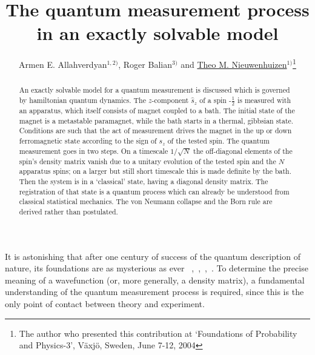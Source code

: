 \documentclass[aps,prb,floatfix,twocolumn]{revtex4}
\newcommand{\half}{\frac{1}{2}}
\begin{document}
 
\title
{The quantum measurement process in an exactly solvable model}
\author{Armen E. Allahverdyan$^{1,2)}$, Roger Balian$^{3)}$
and \underline{Theo M. Nieuwenhuizen}$^{1)}$\footnote{The author who 
presented this contribution at
`Foundations of Probability and Physics-3', V\"axj\"o, Sweden,
June 7-12, 2004}}




\begin{abstract}
An exactly solvable model for a quantum measurement is discussed 
which is governed by hamiltonian quantum dynamics. 
The $z$-component $\hat s_z$ of a spin -$\half$ is measured with an apparatus, 
which itself consists of magnet coupled to a bath.
The initial state of the magnet is a metastable paramagnet, while the bath
starts in a thermal, gibbsian state. 
Conditions are such that the act of measurement drives the magnet in the 
up or down ferromagnetic state according to the sign of  $s_z$ of 
the tested spin. The quantum measurement goes in two steps.
On a timescale $1/\sqrt{N}$ the off-diagonal elements of the spin's density matrix
vanish due to a unitary
evolution of the tested spin and the $N$ apparatus spins; on a larger but
still short timescale this is made definite by the bath.
Then the system is in a `classical' state,
having a diagonal density matrix. The registration of that state is
a quantum process which can already be understood 
from classical statistical mechanics.
The von Neumann collapse and the Born rule are derived rather than postulated.

\end{abstract}

\maketitle

It is astonishing that after one century of success of the quantum description 
of nature, its foundations are as mysterious as ever
~\cite{wh},~\cite{Vaxjo},~\cite{deMuynck},~\cite{Schlosshauer}. To determine
the precise meaning of a wavefunction (or, more generally, a density matrix),
a fundamental understanding of the quantum measurement process is required, since
this is the only point of contact between theory and experiment.
\end{document}
